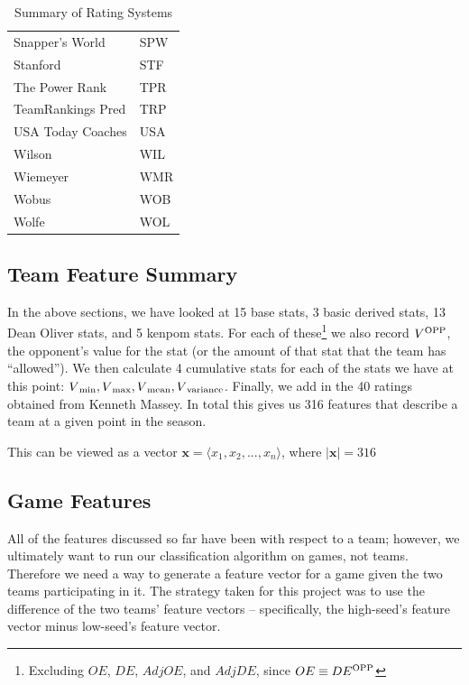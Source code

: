 \documentclass[]{article}
\def\SP#1{\textsuperscript{{#1}}}
\def\SB#1{\textsubscript{{#1}}}
\begin{document}
\begin{table}[ht]
\begin{tabular}{@{}ll@{}}
Snapper's World     & SPW \\
Stanford            & STF \\
The Power Rank      & TPR \\
TeamRankings Pred   & TRP \\
USA Today Coaches   & USA \\
Wilson              & WIL \\
Wiemeyer            & WMR \\
Wobus               & WOB \\
Wolfe               & WOL \\
\bottomrule
\end{tabular}
\caption{Summary of Rating Systems}
\label{table:massey_summary}
\end{table} 


\subsection{Team Feature Summary}

In the above sections, we have looked at 15 base stats, 3 basic derived stats, 13 Dean Oliver stats, and 5 kenpom stats. For each of these\footnote{Excluding $OE$, $DE$, $AdjOE$, and $AdjDE$, since $OE \equiv DE\SP{OPP}$} we also record $V\SP{OPP}$, the opponent's value for the stat (or the amount of that stat that the team has ``allowed''). We then calculate 4 cumulative stats for each of the stats we have at this point: $V\SB{min}, V\SB{max}, V\SB{mean}, V\SB{variance}$. Finally, we add in the 40 ratings obtained from Kenneth Massey. In total this gives us 316 features that describe a team at a given point in the season.

This can be viewed as a vector $\mathbf{x} = \langle x_1, x_2, ..., x_n \rangle$, where $|\mathbf{x}| = 316$

\subsection{Game Features}

All of the features discussed so far have been with respect to a team; however, we ultimately want to run our classification algorithm on games, not teams. Therefore we need a way to generate a feature vector for a game given the two teams participating in it. The strategy taken for this project was to use the difference of the two teams' feature vectors -- specifically, the high-seed's feature vector minus low-seed's feature vector.
\end{document}
